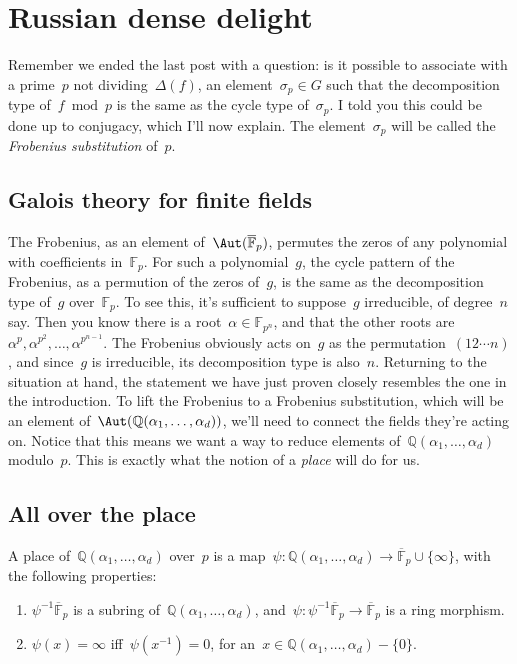 \section{Russian dense delight}

Remember we ended the last post with a question: is it possible to associate with a prime~$p$ not dividing~$\Delta(f)$, an element~$\sigma_{p} \in G$ such that the decomposition type of~$f\bmod p$ is the same as the cycle type of~$\sigma_{p}$. I told you this could be done up to conjugacy, which I'll now explain. The element~$\sigma_{p}$ will be called the \emph{Frobenius substitution} of~$p$.

\subsection{Galois theory for finite fields}
The Frobenius, as an element of~$\Aut(\overline{\mathbb{F}}_{p})$, permutes the zeros of any polynomial with coefficients in~$\mathbb{F}_{p}$. For such a polynomial~$g$, the cycle pattern of the Frobenius, as a permution of the zeros of~$g$, is the same as the decomposition type of~$g$ over~$\mathbb{F}_{p}$. To see this, it's sufficient to suppose~$g$ irreducible, of degree~$n$ say. Then you know there is a root~$\alpha \in \mathbb{F}_{p^{n}}$, and that the other roots are~$\alpha^{p}, \alpha^{p^{2}},\ldots,\alpha^{p^{n-1}}$. The Frobenius obviously acts on~$g$ as the permutation~$(12\cdots n)$, and since~$g$ is irreducible, its decomposition type is also~$n$. Returning to the situation at hand, the statement we have just proven closely resembles the one in the introduction. To lift the Frobenius to a Frobenius substitution, which will be an element of~$\Aut(\mathbb{Q}(\alpha_{1},\ldots,\alpha_{d}))$, we'll need to connect the fields they're acting on. Notice that this means we want a way to reduce elements of~$\mathbb{Q}(\alpha_{1},\ldots,\alpha_{d})$ modulo~$p$. This is exactly what the notion of a \emph{place} will do for us.

\subsection{All over the place}
A place of~$\mathbb{Q}(\alpha_{1},\ldots,\alpha_{d})$ over~$p$ is a map~$\psi:\mathbb{Q}(\alpha_{1},\ldots,\alpha_{d}) \to \overline{\mathbb{F}}_{p}
\cup \{ \infty \}$, with the following properties:
\begin{enumerate}
  \item $\psi^{-1} \overline{\mathbb{F}}_{p}$ is a subring of~$\mathbb{Q}(\alpha_{1},\ldots,\alpha_{d})$, and~$\psi:\psi^{-1} \overline{\mathbb{F}}_{p} \to \overline{\mathbb{F}}_{p}$ is a ring morphism.
  \item $\psi(x)=\infty$ iff~$\psi(x^{-1})=0$, for an~$x \in \mathbb{Q}(\alpha_{1},\ldots,\alpha_{d})-\{0\}$.
\end{enumerate}

